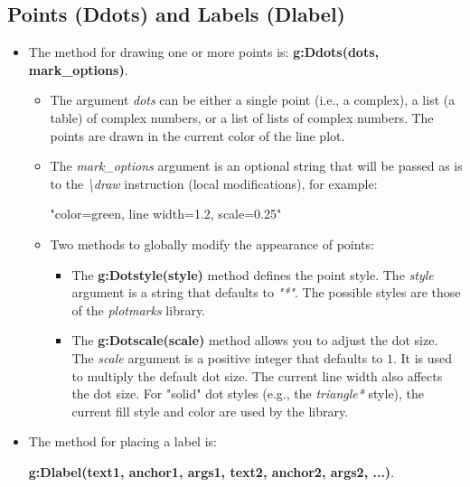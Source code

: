 \subsection{Points (Ddots) and Labels (Dlabel)}

\begin{itemize}
    \item The method for drawing one or more points is: \textbf{g:Ddots(dots, mark\_options)}.

\begin{itemize}
    \item The argument \emph{dots} can be either a single point (i.e., a complex), a list (a table) of complex numbers, or a list of lists of complex numbers. The points are drawn in the current color of the line plot.     \item The \emph{mark\_options} argument is an optional string that will be passed as is to the \emph{\textbackslash draw} instruction (local modifications), for example:
\begin{TeXcode}
"color=green, line width=1.2, scale=0.25"
\end{TeXcode}

    \item Two methods to globally modify the appearance of points:
\begin{itemize}
    \item The \textbf{g:Dotstyle(style)} method defines the point style. The \emph{style} argument is a string that defaults to \emph{"*"}. The possible styles are those of the \emph{plotmarks} library.     \item The \textbf{g:Dotscale(scale)} method allows you to adjust the dot size. The \emph{scale} argument is a positive integer that defaults to $1$. It is used to multiply the default dot size. The current line width also affects the dot size. For "solid" dot styles (e.g., the \emph{triangle*} style), the current fill style and color are used by the library.
\end{itemize}
\end{itemize}

    \item The method for placing a label is:

\hfil\textbf{g:Dlabel(text1, anchor1, args1, text2, anchor2, args2, ...)}.\hfil


\end{itemize}
